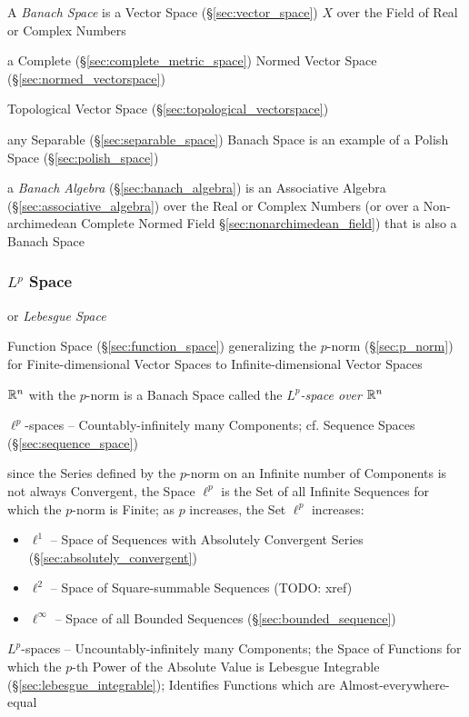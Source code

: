 A \emph{Banach Space} is a Vector Space (\S\ref{sec:vector_space}) $X$ over the
Field of Real or Complex Numbers

a Complete (\S\ref{sec:complete_metric_space}) Normed Vector Space
(\S\ref{sec:normed_vectorspace})

Topological Vector Space (\S\ref{sec:topological_vectorspace})

any Separable (\S\ref{sec:separable_space}) Banach Space is an example of a
Polish Space (\S\ref{sec:polish_space})

a \emph{Banach Algebra} (\S\ref{sec:banach_algebra}) is an Associative Algebra
(\S\ref{sec:associative_algebra}) over the Real or Complex Numbers (or over a
Non-archimedean Complete Normed Field \S\ref{sec:nonarchimedean_field}) that is
also a Banach Space



\subsubsection{$L^p$ Space}\label{sec:lp_space}

or \emph{Lebesgue Space}

Function Space (\S\ref{sec:function_space}) generalizing the $p$-norm
(\S\ref{sec:p_norm}) for Finite-dimensional Vector Spaces to
Infinite-dimensional Vector Spaces

$\mathbb{R}^n$ with the $p$-norm is a Banach Space called the
\emph{$L^p$-space over $\mathbb{R}^n$}

$\ell^p$-spaces -- Countably-infinitely many Components; cf. Sequence Spaces
(\S\ref{sec:sequence_space})

since the Series defined by the $p$-norm on an Infinite number of Components is
not always Convergent, the Space $\ell^p$ is the Set of all Infinite Sequences
for which the $p$-norm is Finite; as $p$ increases, the Set $\ell^p$ increases:
\begin{itemize}
  \item $\ell^1$ -- Space of Sequences with Absolutely Convergent Series
    (\S\ref{sec:absolutely_convergent})
  \item $\ell^2$ -- Space of Square-summable Sequences (TODO: xref)
  \item $\ell^\infty$ -- Space of all Bounded Sequences
    (\S\ref{sec:bounded_sequence})
\end{itemize}

$L^p$-spaces -- Uncountably-infinitely many Components; the Space of Functions
for which the $p$-th Power of the Absolute Value is Lebesgue Integrable
(\S\ref{sec:lebesgue_integrable}); Identifies Functions which are
Almost-everywhere-equal

